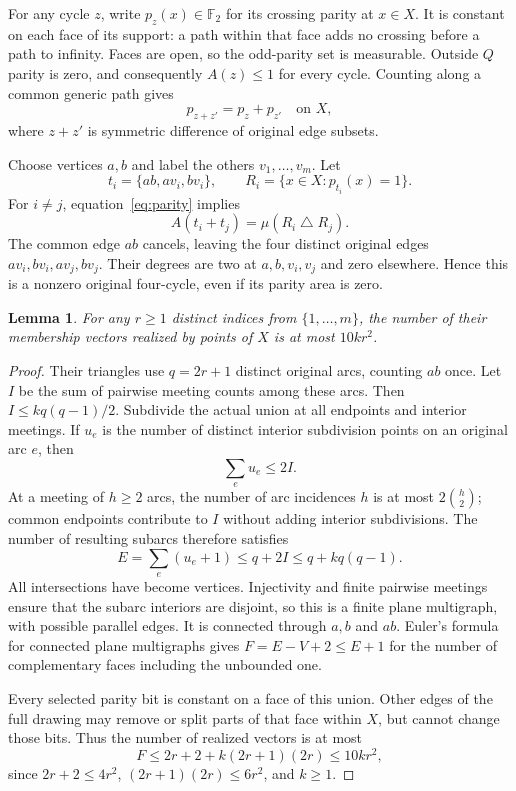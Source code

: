 \documentclass[11pt]{article}
\newtheorem{lemma}[theorem]{Lemma}
\newcommand{\F}{\mathbb F_2}
\newcommand{\triangleop}{\mathbin{\triangle}}
\begin{document}
For any cycle $z$, write $p_z(x)\in\F$ for its crossing parity at $x\in X$. It is constant on each face of its support: a path within that face adds no crossing before a path to infinity. Faces are open, so the odd-parity set is measurable. Outside $Q$ parity is zero, and consequently $A(z)\le1$ for every cycle. Counting along a common generic path gives
\begin{equation}\label{eq:parity}
p_{z+z'}=p_z+p_{z'}\quad\text{on }X,
\end{equation}
where $z+z'$ is symmetric difference of original edge subsets.

Choose vertices $a,b$ and label the others $v_1,\ldots,v_m$. Let
\[
t_i=\{ab,av_i,bv_i\},\qquad R_i=\{x\in X:p_{t_i}(x)=1\}.
\]
For $i\ne j$, equation~\eqref{eq:parity} implies
\begin{equation}\label{eq:distance}
A(t_i+t_j)=\mu(R_i\triangleop R_j).
\end{equation}
The common edge $ab$ cancels, leaving the four distinct original edges $av_i,bv_i,av_j,bv_j$. Their degrees are two at $a,b,v_i,v_j$ and zero elsewhere. Hence this is a nonzero original four-cycle, even if its parity area is zero.

\begin{lemma}\label{lem:patterns}
For any $r\ge1$ distinct indices from $\{1,\ldots,m\}$, the number of their membership vectors realized by points of $X$ is at most $10kr^2$.
\end{lemma}
\begin{proof}
Their triangles use $q=2r+1$ distinct original arcs, counting $ab$ once. Let $I$ be the sum of pairwise meeting counts among these arcs. Then $I\le kq(q-1)/2$. Subdivide the actual union at all endpoints and interior meetings. If $u_e$ is the number of distinct interior subdivision points on an original arc $e$, then
\[
\sum_e u_e\le2I.
\]
At a meeting of $h\ge2$ arcs, the number of arc incidences $h$ is at most $2\binom h2$; common endpoints contribute to $I$ without adding interior subdivisions. The number of resulting subarcs therefore satisfies
\[
E=\sum_e(u_e+1)\le q+2I\le q+kq(q-1).
\]
All intersections have become vertices. Injectivity and finite pairwise meetings ensure that the subarc interiors are disjoint, so this is a finite plane multigraph, with possible parallel edges. It is connected through $a,b$ and $ab$. Euler's formula for connected plane multigraphs \cite[Theorem~15.2.1]{Morris} gives $F=E-V+2\le E+1$ for the number of complementary faces including the unbounded one.

Every selected parity bit is constant on a face of this union. Other edges of the full drawing may remove or split parts of that face within $X$, but cannot change those bits. Thus the number of realized vectors is at most
\[
F\le2r+2+k(2r+1)(2r)\le10kr^2,
\]
since $2r+2\le4r^2$, $(2r+1)(2r)\le6r^2$, and $k\ge1$.
\end{proof}
\end{document}
